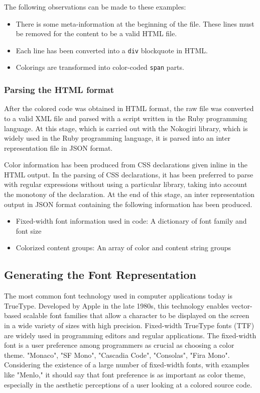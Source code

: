 \documentclass{article}
\begin{document}
The following observations can be made to these examples:

\begin{itemize}
\item There is some meta-information at the beginning of the file. These lines must be removed for the content to be a valid HTML file.
\item Each line has been converted into a \texttt{div} blockquote in HTML.
\item Colorings are transformed into color-coded \texttt{span} parts.
\end{itemize}

\subsubsection{Parsing the HTML format}

After the colored code was obtained in HTML format, the raw file was converted to a valid XML file and parsed with a script written in the Ruby programming language. At this stage, which is carried out with the Nokogiri library\cite{nokogiri2022package}, which is widely used in the Ruby programming language, it is parsed into an inter representation file in JSON format.

Color information has been produced from CSS declarations given inline in the HTML output. In the parsing of CSS declarations, it has been preferred to parse with regular expressions without using a particular library, taking into account the monotony of the declaration. At the end of this stage, an inter representation output in JSON format containing the following information has been produced.

\begin{itemize}
  \item Fixed-width font information used in code: A dictionary of font family and font size
  \item Colorized content groups: An array of color and content string groups
\end{itemize}

\subsection{Generating the Font Representation}

The most common font technology used in computer applications today is TrueType\cite{ttf2022reference}. Developed by Apple in the late 1980s, this technology enables vector-based scalable font families that allow a character to be displayed on the screen in a wide variety of sizes with high precision. Fixed-width TrueType fonts (TTF) are widely used in programming editors and regular applications. The fixed-width font is a user preference among programmers as crucial as choosing a color theme. "Monaco", "SF Mono", "Cascadia Code", "Consolas", "Fira Mono".
Considering the existence of a large number of\cite{wikipedia2022monospace} fixed-width fonts, with examples like "Menlo," it should say that font preference is as important as color theme, especially in the aesthetic perceptions of a user looking at a colored source code\cite{so2010monospace,quora2018monospace}.
\end{document}
